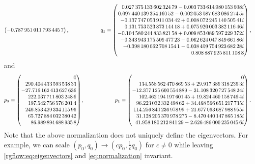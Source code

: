 \begin{subappendices}
\begin{gather}
\begin{pmatrix*}[r]
        \num{-0.7879510117934457}
    \end{pmatrix*}, \hspace{20mm}
    q_1 = \begin{pmatrix*}[r]
        \num{ 0.02737513360232479} - \num{0.003733614980153608}i \\
        \num{ 0.09744013935416052} - \num{0.0020530876830862745}i \\
        \num{-0.13774705391103442} + \num{0.00807224514050541}i \\
        \num{ 0.13175352387314418} + \num{0.07592000338211646}i \\
        \num{-0.10458024483382158} + \num{0.009853089597229372}i \\
        \num{-0.34394317550947723} - \num{0.06262404784966186}i \\
        \num{-0.3981806627081541}  - \num{0.03840975492368228}i \\
        \num{ 0.8088879258111088  }
    \end{pmatrix*},
\end{gather}
and
\begin{gather}
    p_0 =
        \begin{pmatrix*}[r]
        0\\
        \num{290.40443359353833}\\
        \num{-27.716162413627636}\\
        \num{222.0377118032486}\\
        \num{197.5427565762014}\\
        \num{246.85342933411596}\\
        \num{65.72788403238042}\\
        \num{86.9898946889358}
    \end{pmatrix*}, \hspace{20mm}
    p_1 = \begin{pmatrix*}[r]
        0\\
        \num{134.55856247086953} + \num{29.9173893182363}i \\
        \num{-12.377125600554889} - \num{31.10832072754824}i \\
        \num{102.46219419760145} + \num{19.8244601587464}i \\
        \num{96.22303233249862} + \num{34.468566651217735}i \\
        \num{114.25684023697899} + \num{21.677063687988955}i \\
        \num{31.128205370978275} - \num{8.470440147865185}i \\
        \num{41.95818021284129} - \num{2.6264860002350456}i
    \end{pmatrix*}.
\end{gather}
Note that the above normalization does not uniquely define the eigenvectors.
For example, we can scale $(p_0, q_0) \rightarrow (c p_0, \frac1c q_0)$ for $c\neq 0$ while leaving
\cref{rgflow:eq:eigenvectors} and \cref{eq:normalization} invariant.


\end{subappendices}
